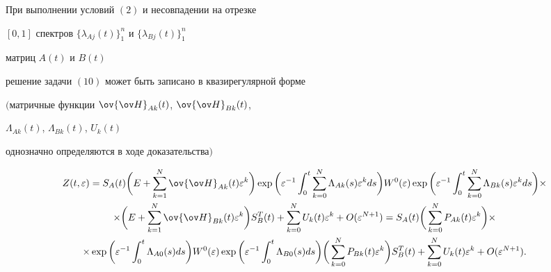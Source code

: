 \begin{thm} 


При выполнении условий $(2)$ и несовпадении на отрезке 


$[0,1]$ спектров $\{\lambda_{Aj}(t)\}^n_1$ и $\{\lambda_{Bj}(t)\}^n_1$ 


матриц $A(t)$ и $B(t)$ 


решение задачи $(10)$ может быть записано в квазирегулярной форме 


$($матричные функции $\ov{\ov H}_{Ak}(t)$, $\ov{\ov H}_{Bk}(t)$, 


$\Lambda_{Ak}(t)$, $\Lambda_{Bk}(t)$, $U_k(t)$ 


однозначно определяются в ходе доказательства$)$ 


\begin{multline} 


Z(t,\varepsilon)=S_A(t)\bigg(E+\sum^N_{k=1} \ov{\ov H}_{Ak}(t) 


\varepsilon^k\bigg)\exp\bigg(\varepsilon^{-1}\int^t_0 \sum^N_{k=0} 


\Lambda_{Ak}(s)\varepsilon^k ds\bigg)W^0(\varepsilon)


\exp\bigg(\varepsilon^{-1}\int^t_0\sum^N_{k=0}


\Lambda_{Bk}(s)\varepsilon^k ds\bigg)\times \\ 


% 


\times\bigg(E+\sum^N_{k=1}\ov{\ov H}_{Bk}(t)\varepsilon^k\bigg) 


S^T_B(t)+\sum^N_{k=0} U_k(t)\varepsilon^k+O(\varepsilon^{N+1})= 


S_A(t)\bigg(\sum^N_{k=0} P_{Ak}(t)\varepsilon^k\bigg)\times\\


%


\times \exp\bigg(\varepsilon^{-1}\int^t_0\Lambda_{A0}(s)ds\bigg)


W^0(\varepsilon)\exp\bigg(\varepsilon^{-1}\int^t_0


\Lambda_{B0}(s)ds\bigg)


\bigg(\sum^N_{k=0} P_{Bk}(t)\varepsilon^k\bigg)S^T_B(t)+ 


\sum^N_{k=0} U_k(t)\varepsilon^k+O(\varepsilon^{N+1}). 


\end{multline} 


\end{thm} 


 





